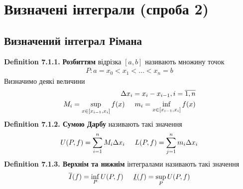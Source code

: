\documentclass[a4paper, 14pt]{extarticle}
\def\defin#1{\textbf{Definition {#1}}}
\begin{document}
\newpage

\section{Визначені інтеграли (спроба 2)}
\subsection{Визначений інтеграл Рімана}
\defin{7.1.1.} \textbf{Розбиттям} відрізка $[a,b]$ називають множину точок
\begin{align*}
P: a = x_0 < x_1 < \dots < x_n = b
\end{align*}
Визначимо деякі величини
\begin{align*}
\Delta x_i = x_i - x_{i-1}, i = \overline{1,n} \\
M_i = \sup_{x \in [x_{i-1}, x_i]} f(x) \hspace{0.5cm} m_i = \inf_{x \in [x_{i-1},x_i]} f(x)
\end{align*}
\defin{7.1.2. Сумою Дарбу} називають такі значення
\begin{align*}
U(P,f) = \sum_{i=1}^n M_i \Delta x_i \hspace{0.5cm} L(P,f) = \sum_{j=1}^n m_i \Delta x_i
\end{align*}
\defin{7.1.3. Верхнім та нижнім} інтегралами називають такі значення
\begin{align*}
\overline{I}(f) = \inf_{P} U(P,f) \hspace{0.5cm} \underline{I}(f) = \sup_{P} U(P,f)
\end{align*}
\end{document}
